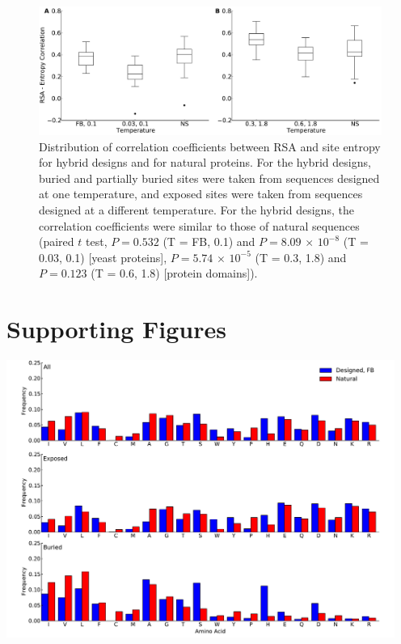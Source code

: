 \documentclass[12pt]{article}
\begin{document}
\begin{figure}[H]
\centerline{\includegraphics[width = 6in]{figures/Combo_Mixed_Temp_Correlation_Plot.pdf}}
\caption{Distribution of correlation coefficients between RSA and site entropy for hybrid designs and for natural proteins. For the hybrid designs, buried and partially buried sites were taken from sequences designed at one temperature, and exposed sites were taken from sequences designed at a different temperature. For the hybrid designs, the correlation coefficients were similar to those of natural sequences (paired $t$ test,  $P=0.532$ (T = FB, 0.1)  and  $P= 8.09 $ $\times$ $10^{-8}$ (T = 0.03, 0.1) [yeast proteins], $P= 5.74$  $\times$ $10^{-5}$ (T = 0.3, 1.8) and $P= 0.123$ (T = 0.6, 1.8)  [protein domains]).}
\label{Mixed_RSA_Entropy}
\end{figure}


\cleardoublepage

\section{Supporting Figures}

\centerline{\includegraphics[width = 5in]{figures/Duncan_Freq_Combo_Plots_00.pdf}}
\end{document}
